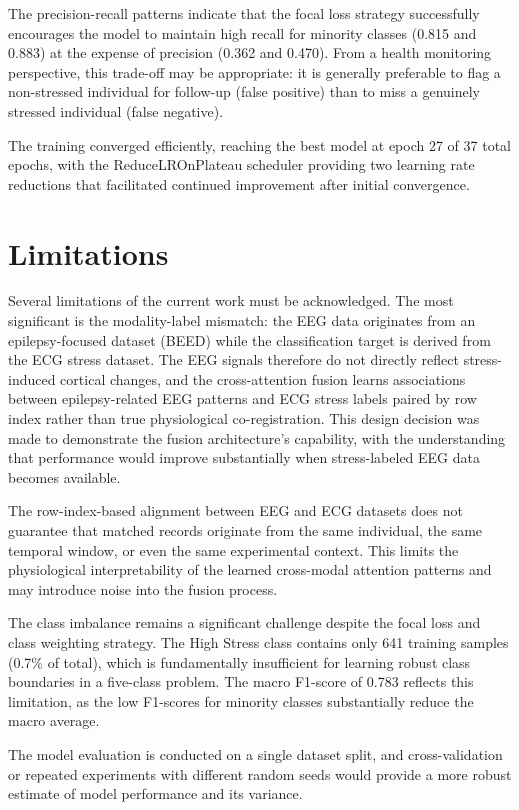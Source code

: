 \documentclass[12pt,letterpaper]{report}
\begin{document}
The precision-recall patterns indicate that the focal loss strategy successfully encourages the model to maintain high recall for minority classes (0.815 and 0.883) at the expense of precision (0.362 and 0.470). From a health monitoring perspective, this trade-off may be appropriate: it is generally preferable to flag a non-stressed individual for follow-up (false positive) than to miss a genuinely stressed individual (false negative).

The training converged efficiently, reaching the best model at epoch 27 of 37 total epochs, with the ReduceLROnPlateau scheduler providing two learning rate reductions that facilitated continued improvement after initial convergence.

\section{Limitations}
\label{sec:limitations}

Several limitations of the current work must be acknowledged. The most significant is the modality-label mismatch: the EEG data originates from an epilepsy-focused dataset (BEED) while the classification target is derived from the ECG stress dataset. The EEG signals therefore do not directly reflect stress-induced cortical changes, and the cross-attention fusion learns associations between epilepsy-related EEG patterns and ECG stress labels paired by row index rather than true physiological co-registration. This design decision was made to demonstrate the fusion architecture's capability, with the understanding that performance would improve substantially when stress-labeled EEG data becomes available.

The row-index-based alignment between EEG and ECG datasets does not guarantee that matched records originate from the same individual, the same temporal window, or even the same experimental context. This limits the physiological interpretability of the learned cross-modal attention patterns and may introduce noise into the fusion process.

The class imbalance remains a significant challenge despite the focal loss and class weighting strategy. The High Stress class contains only 641 training samples (0.7\% of total), which is fundamentally insufficient for learning robust class boundaries in a five-class problem. The macro F1-score of 0.783 reflects this limitation, as the low F1-scores for minority classes substantially reduce the macro average.

The model evaluation is conducted on a single dataset split, and cross-validation or repeated experiments with different random seeds would provide a more robust estimate of model performance and its variance.
\end{document}
